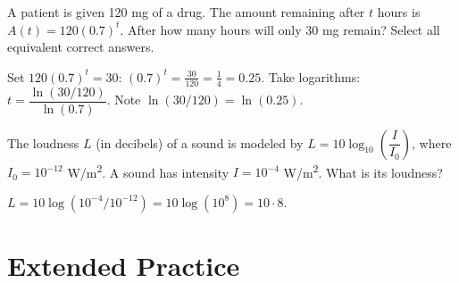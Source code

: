 \documentclass{ximera}
\begin{document}
\begin{problem}
A patient is given 120 mg of a drug. The amount remaining after $t$ hours is $A(t)=120(0.7)^t$. After how many hours will only 30 mg remain? Select all equivalent correct answers.
\begin{hint}
Set $120(0.7)^t=30$: $(0.7)^t=\tfrac{30}{120}=\tfrac{1}{4}=0.25$. Take logarithms: $t=\dfrac{\ln(30/120)}{\ln(0.7)}$. Note $\ln(30/120)=\ln(0.25)$.
\end{hint}
\begin{selectAll}
\end{selectAll}
\end{problem}

\begin{problem}
The loudness $L$ (in decibels) of a sound is modeled by $L = 10\log_{10}\!\left(\dfrac{I}{I_0}\right)$, where $I_0 = 10^{-12}$ W/m\textsuperscript{2}. A sound has intensity $I = 10^{-4}$ W/m\textsuperscript{2}. What is its loudness?
\begin{hint}
$L = 10\log(10^{-4}/10^{-12}) = 10\log(10^8) = 10\cdot8$.
\end{hint}
\begin{multipleChoice}
\end{multipleChoice}
\end{problem}


\bigskip
\section*{Extended Practice}
\end{document}
